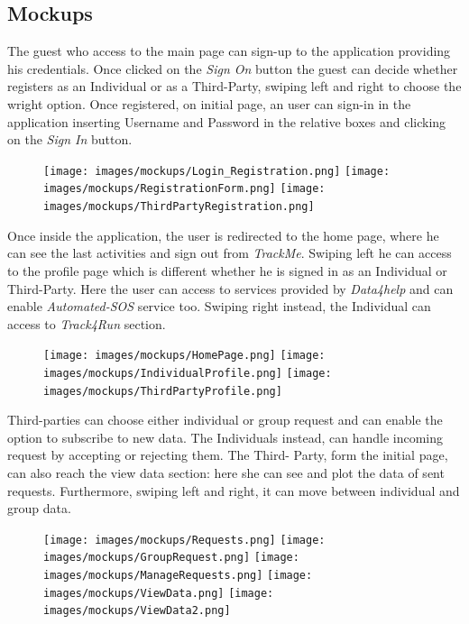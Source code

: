 \documentclass[a4paper]{article}
\begin{document}
\subsection{Mockups}
The guest who access to the main page can sign-up to the application providing his credentials. Once clicked on the \textit{Sign On} button the guest can decide whether registers as an Individual or as a Third-Party, swiping left and right to choose the wright option. Once registered, on initial page, an user can sign-in in the application inserting Username and Password in the relative boxes and clicking on the \textit{Sign In} button. 

\begin{figure}[!htpb]
    	\centering
    	\texttt{[image: images/mockups/Login\_Registration.png]}
    	\texttt{[image: images/mockups/RegistrationForm.png]}
    	\texttt{[image: images/mockups/ThirdPartyRegistration.png]}
        \end{figure}

Once inside the application, the user is redirected to the home page, where he can see the last activities and sign out from \textit{TrackMe}. Swiping left he can access to the profile page which is different whether he is signed in as an Individual or Third-Party. Here the user can access to services provided by \textit{Data4help} and can enable \textit{Automated-SOS} service too. Swiping right instead, the Individual can access to \textit{Track4Run} section.

\begin{figure}[!htpb]
    	\centering
    	\texttt{[image: images/mockups/HomePage.png]}
    	\texttt{[image: images/mockups/IndividualProfile.png]}
    	\texttt{[image: images/mockups/ThirdPartyProfile.png]}
        \end{figure}

Third-parties can choose either individual or group request and can enable the option to subscribe to new data. The Individuals instead, can handle incoming request by accepting or rejecting them. The Third- Party, form the initial page, can also reach the view data section: here she can see and plot the data of sent requests. Furthermore, swiping left and right, it can move between individual and group data.
\begin{figure}[!htpb]		
		
     	\centering		
     	\texttt{[image: images/mockups/Requests.png]}		
     	\texttt{[image: images/mockups/GroupRequest.png]}		
     	\texttt{[image: images/mockups/ManageRequests.png]}		
     	\texttt{[image: images/mockups/ViewData.png]}		
     	\texttt{[image: images/mockups/ViewData2.png]}		
         \end{figure}
        
\end{document}
